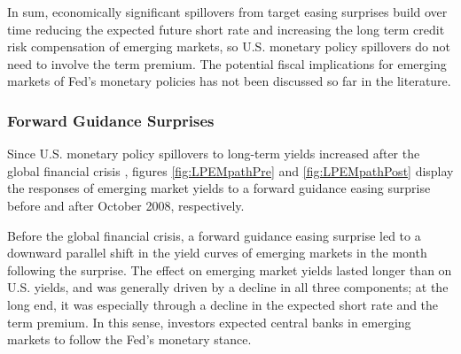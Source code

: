 {%
In sum, economically significant spillovers from target easing surprises build over time reducing the expected future short rate and increasing the long term credit risk compensation of emerging markets, so U.S. monetary policy spillovers do not need to involve the term premium.
The potential fiscal implications for emerging markets of Fed's monetary policies has not been discussed so far in the literature. 


\subsubsection{Forward Guidance Surprises}
\iftoggle{toclinks}{\gototoc}{} %

Since U.S. monetary policy spillovers to long-term yields increased after the global financial crisis \citep{Albaglietal:2019}, figures \ref{fig:LPEMpathPre} and \ref{fig:LPEMpathPost} display the responses of emerging market yields to a forward guidance easing surprise before and after October 2008, respectively.

%	

Before the global financial crisis, a forward guidance easing surprise led to a downward parallel shift in the yield curves of emerging markets in the month following the surprise.
The effect on emerging market yields lasted longer than on U.S. yields, and was generally driven by a decline in all three components; at the long end, it was especially through a decline in the expected short rate and the term premium.
In this sense, investors expected central banks in emerging markets to follow the Fed's monetary stance. 

}
